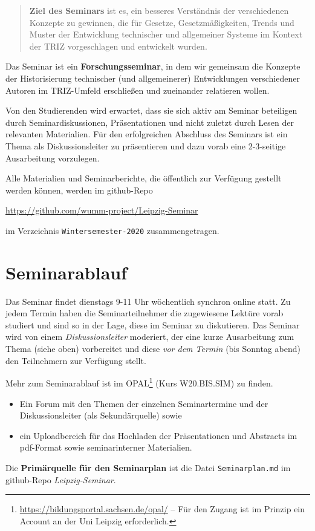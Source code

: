 \documentclass[11pt,a4paper]{article}
\begin{document}
\begin{quote}
  \textbf{Ziel des Seminars} ist es, ein besseres Verständnis der
  verschiedenen Konzepte zu gewinnen, die für Gesetze, Gesetzmäßigkeiten,
  Trends und Muster der Entwicklung technischer und allgemeiner Systeme im
  Kontext der TRIZ vorgeschlagen und entwickelt wurden.
\end{quote}

Das Seminar ist ein \textbf{Forschungsseminar}, in dem wir gemeinsam die
Konzepte der Historisierung technischer (und allgemeinerer) Entwicklungen
verschiedener Autoren im TRIZ-Umfeld erschließen und zueinander relatieren
wollen.

Von den Studierenden wird erwartet, dass sie sich aktiv am Seminar beteiligen
durch Seminardiskussionen, Präsentationen und nicht zuletzt durch Lesen der
relevanten Materialien.  Für den erfolgreichen Abschluss des Seminars ist ein
Thema als Diskussionsleiter zu präsentieren und dazu vorab eine 2-3-seitige
Ausarbeitung vorzulegen.

Alle Materialien und Seminarberichte, die öffentlich zur Verfügung gestellt
werden können, werden im github-Repo
\begin{center}
  \url{https://github.com/wumm-project/Leipzig-Seminar}
\end{center}
im Verzeichnis \texttt{Wintersemester-2020} zusammengetragen.

\section{Seminarablauf}

Das Seminar findet dienstags 9-11 Uhr wöchentlich synchron online statt.  Zu
jedem Termin haben die Seminarteilnehmer die zugewiesene Lektüre vorab
studiert und sind so in der Lage, diese im Seminar zu diskutieren.  Das
Seminar wird von einem \emph{Diskussionsleiter} moderiert, der eine kurze
Ausarbeitung zum Thema (siehe oben) vorbereitet und diese \emph{vor dem
  Termin} (bis Sonntag abend) den Teilnehmern zur Verfügung stellt.

Mehr zum Seminarablauf ist im
OPAL\footnote{\url{https://bildungsportal.sachsen.de/opal/} -- Für den Zugang
  ist im Prinzip ein Account an der Uni Leipzig erforderlich.} (Kurs
W20.BIS.SIM) zu finden.
\begin{itemize}
\item Ein Forum mit den Themen der einzelnen Seminartermine und der
  Diskussionsleiter (als Sekundärquelle) sowie
\item ein Uploadbereich für das Hochladen der Präsentationen und Abstracts im
  pdf-Format sowie seminarinterner Materialien.
\end{itemize}
Die \textbf{Primärquelle für den Seminarplan} ist die Datei
\texttt{Seminarplan.md} im github-Repo \emph{Leipzig-Seminar}.
\end{document}
